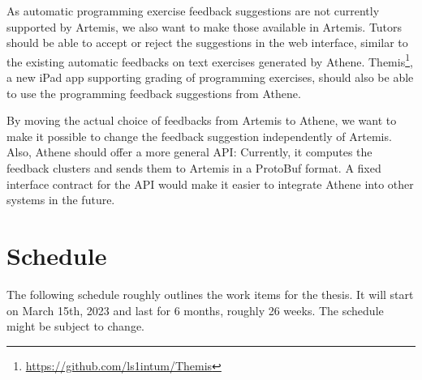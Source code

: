 As automatic programming exercise feedback suggestions are not currently supported by Artemis, we also want to make those available in Artemis. Tutors should be able to accept or reject the suggestions in the web interface, similar to the existing automatic feedbacks on text exercises generated by Athene. Themis\footnote{\url{https://github.com/ls1intum/Themis}}, a new iPad app supporting grading of programming exercises, should also be able to use the programming feedback suggestions from Athene.

By moving the actual choice of feedbacks from Artemis to Athene, we want to make it possible to change the feedback suggestion independently of Artemis. Also, Athene should offer a more general API: Currently, it computes the feedback clusters and sends them to Artemis in a ProtoBuf format. A fixed interface contract for the API would make it easier to integrate Athene into other systems in the future.


\section*{Schedule}

The following schedule roughly outlines the work items for the thesis. It will start on March 15th, 2023 and last for 6 months, roughly 26 weeks. The schedule might be subject to change.


